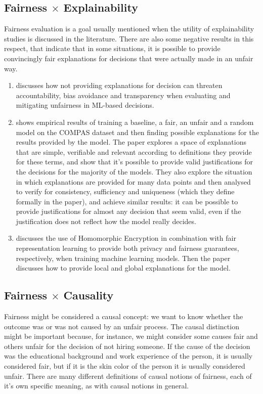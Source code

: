 \subsection{Fairness $\times$ Explainability}

Fairness evaluation is a goal usually mentioned when the utility of explainability studies is discussed in the literature\cite{rueda2022just}. There are also some negative results in this respect, that indicate that in some situations, it is possible to provide convincingly fair explanations for decisions that were actually made in an unfair way\cite{ExplainAll}.

\begin{enumerate}
\item \cite{rueda2022just} discusses how not providing explanations for decision can threaten accountability, bias avoidance and transparency when evaluating and mitigating unfairness in ML-based decisions.
\item \cite{ExplainAll} shows empirical results of training a baseline, a fair, an unfair and a random model on the COMPAS\cite{Compass} dataset and then finding possible explanations for the results provided by the model. The paper explores a space of explanations that are simple, verifiable and relevant according to definitions they provide for these terms, and show that it's possible to provide valid justifications for the decisions for the majority of the models. They also explore the situation in which explanations are provided for many data points and then analysed to verify for consistency, sufficiency and uniqueness (which they define formally in the paper), and achieve similar results: it can be possible to provide justifications for almost any decision that seem valid, even if the justification does not reflect how the model really decides.
\item \cite{franco2021toward} discusses the use of Homomorphic Encryption in combination with fair representation learning \cite{zemel2013learning} to provide both privacy and fairness guarantees, respectively, when training machine learning models. Then the paper discusses how to provide local and global explanations for the model.
\end{enumerate}

\subsection{Fairness $\times$ Causality}

Fairness might be considered a causal concept: we want to know whether the outcome was or was not caused by an unfair process. The causal distinction might be important because, for instance, we might consider some causes fair and others unfair for the decision of not hiring someone. If the cause of the decision was the educational background and work experience of the person, it is usually considered fair, but if it is the skin color of the person it is usually considered unfair. There are many different definitions of causal notions of fairness, each of it's own specific meaning, as with causal notions in general.

